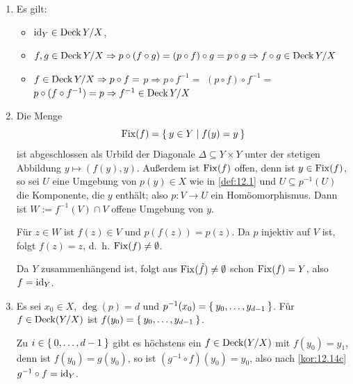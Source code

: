 \begin{beweis}\leavevmode
    \begin{enumerate}[label=\alph*)]
        \item Es gilt:
            \begin{itemize}
                \item $\textnormal{id}_Y \in \operatorname{Deck}{Y/X}$,
                \item $f,g \in \operatorname{Deck}{Y/X} \Rightarrow p \circ (f \circ g) = (p \circ f) \circ g = p \circ g \Rightarrow f \circ g \in \operatorname{Deck}{Y/X}$
                \item $f \in \operatorname{Deck}{Y/X} \Rightarrow p \circ f =$
                      $p \Rightarrow p \circ f^{-1} =$
                      $(p \circ f) \circ f^{-1} =$
                      $p \circ (f \circ f^{-1}) = p \Rightarrow f^{-1} \in \operatorname{Deck}{Y/X}$
            \end{itemize}
        \item Die Menge
              \[\operatorname{Fix}(f) = \Set{y \in Y | f(y) = y}\]
              ist abgeschlossen als Urbild der Diagonale 
              $\Delta \subseteq Y \times Y$ unter der stetigen
              Abbildung $y \mapsto (f(y),y)$. Außerdem ist $\operatorname{Fix}(f)$
              offen, denn ist $y \in \operatorname{Fix}(f)$, so sei $U$ eine 
              Umgebung von $p(y) \in X$ wie in \cref{def:12.1}
              und $U \subseteq p^{-1}(U)$ die Komponente, die $y$
              enthält; also $p:V \rightarrow U$ ein Homöomorphismus.
              Dann ist $W := f^{-1}(V) \cap V$ offene Umgebung von $y$.

              Für $z \in W$ ist $f(z) \in V$ und $p(f(z)) = p(z)$.
              Da $p$ injektiv auf $V$ ist, folgt $f(z) = z$, d.~h.
              $\operatorname{Fix}(f) \neq \emptyset$.

              Da $Y$ zusammenhängend ist, folgt aus $\operatorname{Fix}(\tilde{f}) \neq \emptyset$
              schon $\operatorname{Fix}(f) = Y$, also $f = \textnormal{id}_Y$.
        \item Es sei $x_0 \in X$, $\deg(p) = d$ und $p^{-1}(x_0) = \Set{y_0, \dots, y_{d-1}}$.
              Für $f \in \operatorname{Deck}(Y/X)$ ist $f(y_0)= \Set{y_0, \dots, y_{d-1}}$.

              Zu $i \in \Set{0, \dots, d-1}$ gibt es höchstens ein 
              $f \in \operatorname{Deck}(Y/X)$ mit $f(y_0) = y_1$, denn ist
              $f(y_0) = g(y_0)$, so ist $(g^{-1} \circ f)(y_0) = y_0$,
              also nach \cref{kor:12.14c} $g^{-1} \circ f = \textnormal{id}_Y$.
    \end{enumerate}
\end{beweis}

